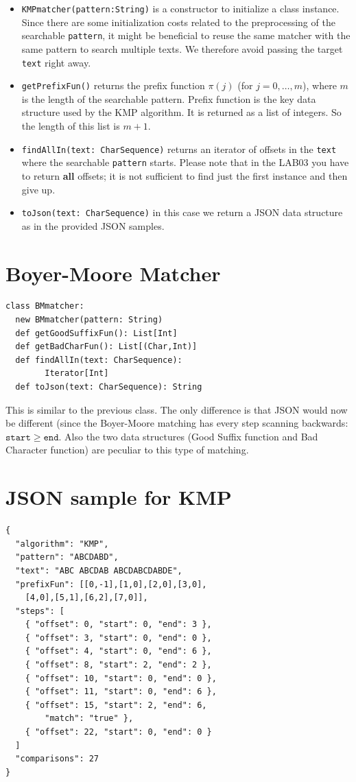 \documentclass[jou]{apa6}
\begin{document}
\begin{itemize}
\item {\tt KMPmatcher(pattern:String)} is a constructor to 
initialize a class instance. Since there are some initialization costs
related to the preprocessing of the searchable {\tt pattern}, 
it might be beneficial to reuse the same matcher with the same 
pattern to search multiple texts. We therefore avoid passing 
the target {\tt text} right away.
\item {\tt getPrefixFun()} returns the prefix function $\pi(j)$ (for $j=0,\ldots,m$), 
where $m$ is the length of the searchable pattern. 
Prefix function is the key data structure used by the KMP algorithm. 
It is returned as a list of integers. So the length of this
list is $m+1$.
\item {\tt findAllIn(text: CharSequence)} returns an iterator of 
offsets in the {\tt text} where the searchable {\tt pattern} starts. 
Please note that in the LAB03 you have to return {\bf all} offsets; 
it is not sufficient to find just the first instance and then give up.
\item {\tt toJson(text: CharSequence)} in this case we return a 
JSON data structure as in the provided JSON samples.
\end{itemize}


\section{Boyer-Moore Matcher}

\begin{verbatim}
class BMmatcher:
  new BMmatcher(pattern: String)
  def getGoodSuffixFun(): List[Int]
  def getBadCharFun(): List[(Char,Int)]
  def findAllIn(text: CharSequence): 
        Iterator[Int]
  def toJson(text: CharSequence): String
\end{verbatim}

This is similar to the previous class. The only difference is that 
JSON would now be different (since the Boyer-Moore matching has 
every step scanning backwards: $\mathtt{start} \geq \mathtt{end}$.
Also the two data structures (Good Suffix function and Bad Character function) 
are peculiar to this type of matching. 

\section{JSON sample for KMP}

\begin{verbatim}
{
  "algorithm": "KMP",
  "pattern": "ABCDABD",
  "text": "ABC ABCDAB ABCDABCDABDE",
  "prefixFun": [[0,-1],[1,0],[2,0],[3,0],
    [4,0],[5,1],[6,2],[7,0]],
  "steps": [
    { "offset": 0, "start": 0, "end": 3 },
    { "offset": 3, "start": 0, "end": 0 },
    { "offset": 4, "start": 0, "end": 6 },
    { "offset": 8, "start": 2, "end": 2 },
    { "offset": 10, "start": 0, "end": 0 },
    { "offset": 11, "start": 0, "end": 6 },
    { "offset": 15, "start": 2, "end": 6, 
	    "match": "true" },   
    { "offset": 22, "start": 0, "end": 0 }
  ]
  "comparisons": 27
}
\end{verbatim}
\end{document}
